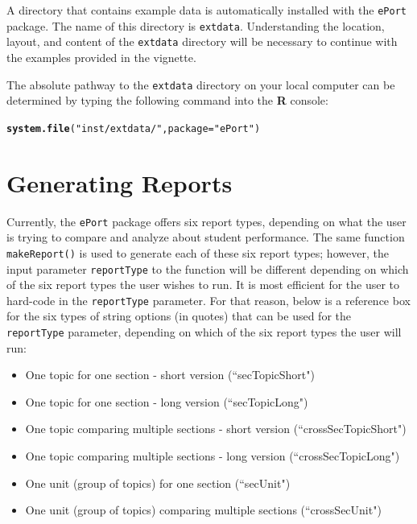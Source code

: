 \documentclass[11pt,a4paper,oldfontcommands,openany]{memoir}
\makeatletter
\newcommand{\hlstr}[1]{\textcolor[rgb]{0.192,0.494,0.8}{#1}}%
\newcommand{\hlstd}[1]{\textcolor[rgb]{0.345,0.345,0.345}{#1}}%
\newcommand{\hlkwc}[1]{\textcolor[rgb]{0.333,0.667,0.333}{#1}}%
\newcommand{\hlkwd}[1]{\textcolor[rgb]{0.737,0.353,0.396}{\textbf{#1}}}%
\newenvironment{kframe}{%
 \def\at@end@of@kframe{}%
 \ifinner\ifhmode%
  \def\at@end@of@kframe{\end{minipage}}%
  \begin{minipage}{\columnwidth}%
 \fi\fi%
 \def\FrameCommand##1{\hskip\@totalleftmargin \hskip-\fboxsep
 \colorbox{shadecolor}{##1}\hskip-\fboxsep
     \hskip-\linewidth \hskip-\@totalleftmargin \hskip\columnwidth}%
 \MakeFramed {\advance\hsize-\width
   \@totalleftmargin\z@ \linewidth\hsize
   \@setminipage}}%
 {\par\unskip\endMakeFramed%
 \at@end@of@kframe}
\newenvironment{knitrout}{}{} %
\numberwithin{equation}{section} %
\newcommand{\pkg}[1]{{\texttt{#1}}}
\makeatother
\begin{document}
A directory that contains example data is automatically installed with the \texttt{ePort} package. The name of this directory is \texttt{extdata}. Understanding the location, layout, and content of the \texttt{extdata} directory will be necessary to continue with the examples provided in the vignette.

The absolute pathway to the \texttt{extdata} directory on your local computer can be determined by typing the following command into the \textbf{\textsf{R}} console: \\

\begin{knitrout}
\color{fgcolor}\begin{kframe}
\begin{alltt}
\hlkwd{system.file}\hlstd{(}\hlstr{"inst/extdata/"}\hlstd{,} \hlkwc{package} \hlstd{=} \hlstr{"ePort"}\hlstd{)}
\end{alltt}
\end{kframe}
\end{knitrout}

\chapter{Generating Reports}

Currently, the \pkg{ePort} package offers six report types, depending on what the user is trying to compare and analyze about student performance. The same function \texttt{makeReport()} is used to generate each of these six report types; however, the input parameter \texttt{reportType} to the function will be different depending on which of the six report types the user wishes to run. It is most efficient for the user to hard-code in the \texttt{reportType} parameter. For that reason, below is a reference box for the six types of string options (in quotes) that can be used for the \texttt{reportType} parameter, depending on which of the six report types the user will run: 
\begin{framed}
\begin{itemize}
\vspace{-3mm}
\item One topic for one section - short version (``secTopicShort")
\item One topic for one section - long version (``secTopicLong")
\item One topic comparing multiple sections - short version (``crossSecTopicShort")
\item One topic comparing multiple sections - long version (``crossSecTopicLong")
\item One unit (group of topics) for one section (``secUnit")
\item One unit (group of topics) comparing multiple sections (``crossSecUnit")
\end{itemize}
\end{framed}
\end{document}
